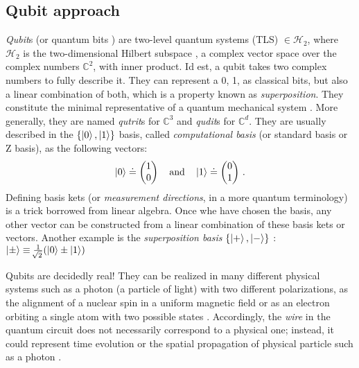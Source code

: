 \documentclass[11pt]{article}
\numberwithin{equation}{section} %
\numberwithin{figure}{section} %
\begin{document}
\begin{appendices}
\subsection{Qubit approach} \label{qubit_approach}
\emph{Qubit}s (or quantum bits \cite[p.~4, l.~2]{Nielsen}) are two-level quantum systems (TLS) $\in\mathcal{H}_2$, where $\mathcal{H}_2$ is the two-dimensional Hilbert subspace \cite[p.~43, l.~11-12]{Nielsen}, a complex vector space over the complex numbers $\mathbb{C}^2$, with inner product. Id est, a qubit takes two complex numbers to fully describe it. They can represent a 0, 1, as classical bits, but also a linear combination of both, which is a property known as \emph{superposition}. They constitute the minimal representative of a quantum mechanical system \cite[p.~80, l.~30-31]{Nielsen}. More generally, they are named \emph{qutrit}s for $\mathbb{C}^3$ and \emph{qudit}s for $\mathbb{C}^d$. They are usually described in the $\{\ket{0},\ket{1}\}$ basis, called \emph{computational basis} (or standard basis or Z basis), as the following vectors: $\,$ \cite[p.~xxix, l.~20-21]{Nielsen}
\begin{equation}
\ket{0}\doteq\begin{pmatrix}1\\0\end{pmatrix}\quad\textrm{and}\quad\ket{1}\doteq\begin{pmatrix}0\\1\end{pmatrix}\,\textrm{.}
\end{equation}
Defining basis kets (or \emph{measurement directions}, in a more quantum terminology) is a trick borrowed from linear algebra. Once whe have chosen the basis, any other vector can be constructed from a linear combination of these basis kets or vectors. Another example is the \emph{superposition basis} $\{\ket{+},\ket{-}\}$ $:$ $\ket{\pm}\equiv\frac{1}{\sqrt[]{2}}(\ket{0}\pm\ket{1})$

Qubits are decidedly real! They can be realized in many different physical systems such as a photon (a particle of light) with two different polarizations, as the alignment of a nuclear spin in a uniform magnetic field or as an electron orbiting a single atom with two possible states \cite[p.~14, l.~15-16]{Nielsen}. Accordingly, the \emph{wire} in the quantum circuit does not necessarily correspond to a physical one; instead, it could represent time evolution or the spatial propagation of physical particle such as a photon  \cite[p.~23, l.~1-3]{Nielsen}.


\end{appendices}
\end{document}
